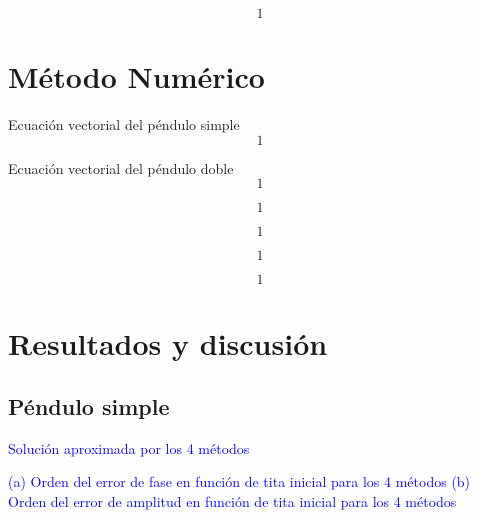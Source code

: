 \documentclass[aps,prb,twocolumn,superscriptaddress,floatfix,longbibliography]{revtex4-2}
\newcounter{para}
\begin{document}
\begin{equation}
  1
  \label{eq:amplitud_doble}
\end{equation}


\section{Método Numérico}

Ecuación vectorial del péndulo simple
\begin{equation}
  1
  \label{eq:pendulo_simple_vec}
\end{equation}

Ecuación vectorial del péndulo doble
\begin{equation}
  1
  \label{eq:pendulo_doble_vec}
\end{equation}

\begin{equation}
  1
  \label{eq:Euler_implicito}
\end{equation}

\begin{equation}
  1
  \label{eq:Crank_Nicholson}
\end{equation}

\begin{equation}
  1
  \label{eq:Runge_Kutta_4}
\end{equation}

\begin{equation}
  1
  \label{eq:Leap_Frog}
\end{equation}



\section{Resultados y discusión}

\subsection{Péndulo simple}

\textcolor{blue}{Solución aproximada por los 4 métodos}


\textcolor{blue}{(a) Orden del error de fase en función de tita inicial para los 4 métodos}
\textcolor{blue}{(b) Orden del error de amplitud en función de tita inicial para los 4 métodos}
\end{document}
